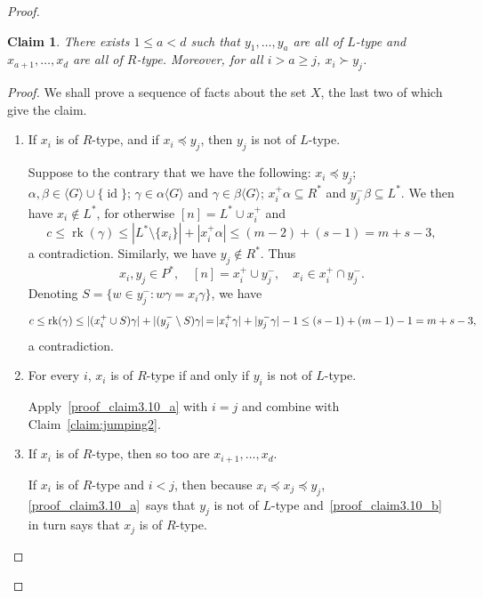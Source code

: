 \documentclass[10pt]{amsart}
\newtheorem{claim}[proposition]{Claim}
\DeclareMathOperator{\rk}{rk}
\DeclareMathOperator{\id}{id}
\newcommand{\genset}[1]{\langle#1\rangle}
\newcommand{\nset}{[n]}
\newcommand*{\Mk}{\mkern -2mu}
\begin{document}
\begin{proof}
\begin{claim} \label{claim:jumping3}
 There exists $1 \le a < d$ such that $y_1, \dots, y_a$ are all of $L$-type
 and $x_{a+1}, \dots, x_d$ are all of $R$-type. Moreover, for all $i > a \ge
 j$, $x_i \succ y_j$.
\end{claim}

\begin{proof} 
 We shall prove a sequence of facts about the set $X$, the last two of which give the claim.

\begin{enumerate}[label=(\alph*)]
 \item\label{proof_claim3.10_a} 
 If $x_i$ is of $R$-type, and if $x_i \preceq y_j$, then $y_j$
 is not of $L$-type.

 Suppose to the contrary that we have the following: $x_i \preceq
 y_j$; $\alpha, \beta \in \genset{G} \cup \{ \id \}$; $\gamma \in \alpha
 \genset{G}$ and $\gamma \in \beta \genset{G}$; $x_i^+ \alpha \subseteq R^*$
 and $y_j^- \beta \subseteq L^*$. We then have $x_i \notin L^*$, for otherwise
 $\nset = L^* \cup x_i^+$ and \[ c \le \rk(\gamma) \le |L^*
 \setminus \{ x_i \}| + |x_i^+ \alpha| \le (m-2) + (s-1) = m + s - 3, \] a
 contradiction. Similarly, we have $y_j \notin R^*$. Thus 
 \[ x_i, y_j \in P^*, \quad \nset = x_i^+ \cup y_j^-, \quad x_i \in
 x_i^+ \cap y_j^-. \] 
 Denoting $S = \{ w \in y_j^- : w \gamma= x_i \gamma \}$, we have \[ c \le
 \rk(\gamma) \le |(x_i^+ \cup S) \gamma| + |(y_j^- \setminus S) \gamma| \Mk =\Mk 
 |x_i^+ \gamma| + |y_j^- \gamma| - 1 \le (s-1) + (m-1) - 1 = m + s - 3, \] a
 contradiction.

 \item\label{proof_claim3.10_b} 
 For every $i$, $x_i$ is of $R$-type if and only if $y_i$ is not of $L$-type.

Apply~\ref{proof_claim3.10_a} with $i=j$ and combine with Claim~\ref{claim:jumping2}.

 \item\label{proof_claim3.10_c} 
 If $x_i$ is of $R$-type, then so too are $x_{i+1},\ldots,x_d$.

If $x_i$ is of $R$-type and $i < j$, then because $x_i\preceq x_j\preceq y_j$, \ref{proof_claim3.10_a}~says that $y_j$ is not of $L$-type and~\ref{proof_claim3.10_b} in turn says that $x_j$ is of $R$-type.


\end{enumerate}
\end{proof}
\end{proof}
\end{document}
